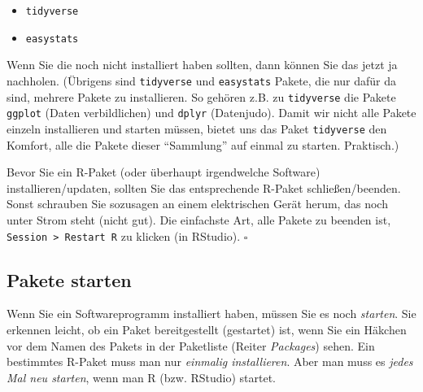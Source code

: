 \documentclass[
  letterpaper,
  twoside,
  open=any]{scrbook}
\providecommand{\tightlist}{%
  \setlength{\itemsep}{0pt}\setlength{\parskip}{0pt}}\usepackage{longtable,booktabs,array}
\theoremstyle{definition}
\theoremstyle{definition}
\theoremstyle{definition}
\theoremstyle{remark}
\begin{document}
\begin{itemize}
\tightlist
\item
  \texttt{tidyverse}
\item
  \texttt{easystats}
\end{itemize}

Wenn Sie die noch nicht installiert haben sollten, dann können Sie das
jetzt ja nachholen. (Übrigens sind \texttt{tidyverse} und
\texttt{easystats} Pakete, die nur dafür da sind, mehrere Pakete zu
installieren. So gehören z.B. zu \texttt{tidyverse} die Pakete
\texttt{ggplot} (Daten verbildlichen) und \texttt{dplyr} (Datenjudo).
Damit wir nicht alle Pakete einzeln installieren und starten müssen,
bietet uns das Paket \texttt{tidyverse} den Komfort, alle die Pakete
dieser \enquote{Sammlung} auf einmal zu starten. Praktisch.)

\begin{tcolorbox}[enhanced jigsaw, colframe=quarto-callout-caution-color-frame, arc=.35mm, leftrule=.75mm, bottomtitle=1mm, titlerule=0mm, colbacktitle=quarto-callout-caution-color!10!white, breakable, bottomrule=.15mm, colback=white, left=2mm, rightrule=.15mm, opacityback=0, toptitle=1mm, toprule=.15mm, opacitybacktitle=0.6, title=\textcolor{quarto-callout-caution-color}{\faFire}\hspace{0.5em}{Vorsicht}, coltitle=black]

Bevor Sie ein R-Paket (oder überhaupt irgendwelche Software)
installieren/updaten, sollten Sie das entsprechende R-Paket
schließen/beenden. Sonst schrauben Sie sozusagen an einem elektrischen
Gerät herum, das noch unter Strom steht (nicht gut). Die einfachste Art,
alle Pakete zu beenden ist, \texttt{Session\ \textgreater{}\ Restart\ R}
zu klicken (in RStudio). \(\square\)

\end{tcolorbox}

\subsection{Pakete starten}\label{pakete-starten}

Wenn Sie ein Softwareprogramm installiert haben, müssen Sie es noch
\emph{starten}. Sie erkennen leicht, ob ein Paket bereitgestellt
(gestartet) ist, wenn Sie ein Häkchen vor dem Namen des Pakets in der
Paketliste (Reiter \emph{Packages}) sehen. Ein bestimmtes R-Paket muss
man nur \emph{einmalig installieren}. Aber man muss es \emph{jedes Mal
neu starten}, wenn man R (bzw. RStudio) startet.
\end{document}
